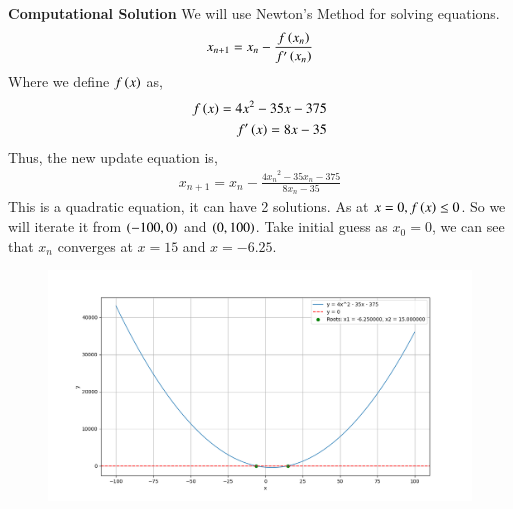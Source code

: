 \documentclass[journal]{IEEEtran}
\begin{document}
\textbf{Computational Solution}
We will use Newton's Method for solving equations.
\begin{align}
	x_{n+1} = x_n - \frac{f\left(x_n\right)}{f^{\prime}\left(x_n\right)} 
\end{align}
Where we define $f\left(x\right)$ as, 
\begin{align}
	f\left(x\right) = 4x^2 - 35x - 375 \\
	f^{\prime}\left(x\right) = 8x -35 
\end{align}
Thus, the new update equation is, 
\begin{align}
	x_{n+1} = x_n - \frac{{4x_n}^2 - 35x_n - 375}{8x_n -35} 
\end{align}
This is a quadratic equation, it can have 2 solutions. As at $x=0,f\left(x\right) \leq 0$. So we will iterate it from $ \left(-100,0\right) $ and $\left(0,100\right)$. Take initial guess as $x_0 = 0$, we can see that $x_n$ converges at $x=15$ and $x=-6.25$.

\begin{figure}[h]
    \centering
    \includegraphics[width=\columnwidth]{figs/Figure_1.png}
    \label{fig:Plot}
    \end{figure}
\end{document}
